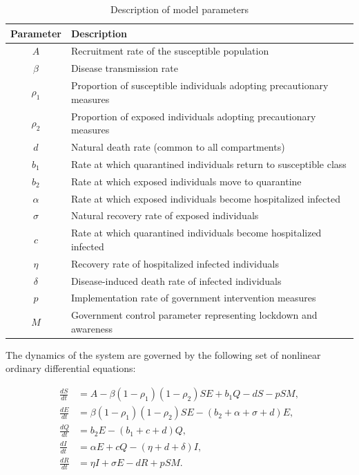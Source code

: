 \documentclass[12pt,a4paper]{article}
\begin{document}
\begin{table}[H]
\centering
\caption{Description of model parameters}
\renewcommand{\arraystretch}{1.2}
\begin{tabular}{cl}
\hline
\textbf{Parameter} & \textbf{Description} \\
\hline
$A$ & Recruitment rate of the susceptible population \\
$\beta$ & Disease transmission rate \\
$\rho_1$ & Proportion of susceptible individuals adopting precautionary measures \\
$\rho_2$ & Proportion of exposed individuals adopting precautionary measures \\
$d$ & Natural death rate (common to all compartments) \\
$b_1$ & Rate at which quarantined individuals return to susceptible class \\
$b_2$ & Rate at which exposed individuals move to quarantine \\
$\alpha$ & Rate at which exposed individuals become hospitalized infected \\
$\sigma$ & Natural recovery rate of exposed individuals \\
$c$ & Rate at which quarantined individuals become hospitalized infected \\
$\eta$ & Recovery rate of hospitalized infected individuals \\
$\delta$ & Disease-induced death rate of infected individuals \\
$p$ & Implementation rate of government intervention measures \\
$M$ & Government control parameter representing lockdown and awareness \\
\hline
\end{tabular}
\end{table}



The dynamics of the system are governed by the following set of nonlinear ordinary differential equations:

\begin{align}
\frac{dS}{dt} &= A - \beta(1-\rho_1)(1-\rho_2)SE + b_1 Q - dS - pSM, \\
\frac{dE}{dt} &= \beta(1-\rho_1)(1-\rho_2)SE - (b_2 + \alpha + \sigma + d)E, \\
\frac{dQ}{dt} &= b_2 E - (b_1 + c + d)Q, \\
\frac{dI}{dt} &= \alpha E + cQ - (\eta + d + \delta)I, \\
\frac{dR}{dt} &= \eta I + \sigma E - dR + pSM.
\end{align}
\end{document}
